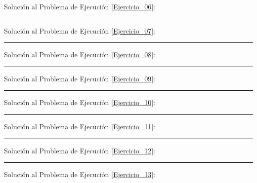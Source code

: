 \documentclass[12pt, letter]{exam}
\begin{document}
Solución al Problema de Ejecución \ref{Ejercicio_06}:

\vspace*{4.5cm}
\rule{0.9\textwidth}{0.1mm}

Solución al Problema de Ejecución \ref{Ejercicio_07}:

\vspace*{4.5cm}
\rule{0.9\textwidth}{0.1mm}

Solución al Problema de Ejecución \ref{Ejercicio_08}:

\vspace*{4.5cm}
\rule{0.9\textwidth}{0.1mm}

Solución al Problema de Ejecución \ref{Ejercicio_09}:

\vspace*{4.5cm}
\rule{0.9\textwidth}{0.1mm}

Solución al Problema de Ejecución \ref{Ejercicio_10}:

\vspace*{4.5cm}
\rule{0.9\textwidth}{0.1mm}

Solución al Problema de Ejecución \ref{Ejercicio_11}:

\vspace*{4.5cm}
\rule{0.9\textwidth}{0.1mm}

Solución al Problema de Ejecución \ref{Ejercicio_12}:

\vspace*{4.5cm}
\rule{0.9\textwidth}{0.1mm}

Solución al Problema de Ejecución \ref{Ejercicio_13}:
\end{document}
